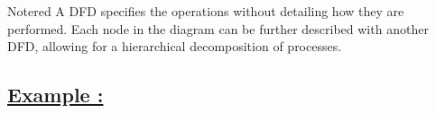 \vspace{0.5cm}

\begin{prettyBox}{Note}{red}
    A DFD specifies the operations without detailing how they are performed. Each node in the diagram can be further described with another DFD, allowing for a hierarchical decomposition of processes.
\end{prettyBox}

\vspace{0.5cm}

\subsection*{\underline{Example :}}
